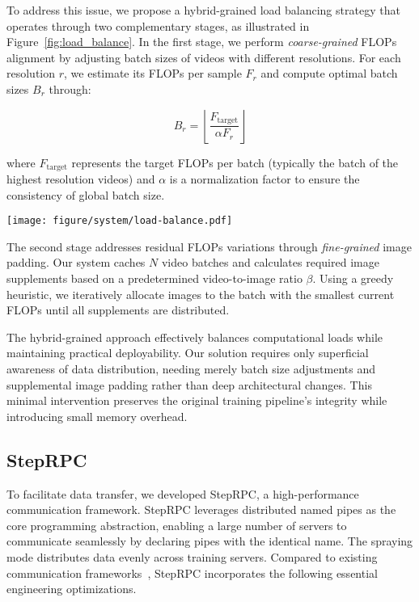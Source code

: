 To address this issue, we propose a hybrid-grained load balancing strategy that operates through two complementary stages, as illustrated in Figure~\ref{fig:load_balance}.
In the first stage, we perform \textit{coarse-grained} FLOPs alignment by adjusting batch sizes of videos with different resolutions.
For each resolution $r$, we estimate its FLOPs per sample $F_r$ and compute optimal batch sizes $B_r$ through:

\begin{equation}
B_r = \left\lfloor \frac{F_{\text{target}}}{\alpha F_r} \right\rfloor
\end{equation}

where $F_{\text{target}}$ represents the target FLOPs per batch (typically the batch of the highest resolution videos) and $\alpha$ is a normalization factor to ensure the consistency of global batch size.

\begin{figure*}[h]
    \centering
    \texttt{[image: figure/system/load-balance.pdf]}
    \caption{Load balancing with hybrid granularity.}
    \label{fig:load_balance}
\end{figure*}


The second stage addresses residual FLOPs variations through \textit{fine-grained} image padding.
Our system caches $N$ video batches and calculates required image supplements based on a predetermined video-to-image ratio $\beta$.
Using a greedy heuristic, we iteratively allocate images to the batch with the smallest current FLOPs until all supplements are distributed.

The hybrid-grained approach effectively balances computational loads while maintaining practical deployability.
Our solution requires only superficial awareness of data distribution, needing merely batch size adjustments and supplemental image padding rather than deep architectural changes.
This minimal intervention preserves the original training pipeline's integrity while introducing small memory overhead.



\subsection{StepRPC}
\label{subsec:system_steprpc}



To facilitate data transfer, we developed StepRPC, a high-performance communication framework. StepRPC leverages distributed named pipes as the core programming abstraction, enabling a large number of servers to communicate seamlessly by declaring pipes with the identical name. The spraying mode distributes data evenly across training servers. Compared to existing communication frameworks~\cite{ray,damania2023pytorchrpc,mooncacke}, StepRPC incorporates the following essential engineering optimizations.


